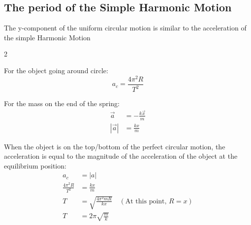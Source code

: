 \subsection{The period of the Simple Harmonic Motion}
The y-component of the uniform circular motion is similar to the acceleration of the simple Harmonic Motion
\begin{paracol}{2}
    \begin{leftcolumn}
        For the object going around circle:
        \begin{equation}
            a_c = \frac{4 \pi^2 R}{T^2}
        \end{equation}
    \end{leftcolumn}
    \begin{rightcolumn}
        For the mass on the end of the spring:
        \begin{align*}
            \vec{a} &= -\frac{k \vec{x}}{m}\\
            \left| \vec{a} \right| &= \frac{kx}{m}
        \end{align*}
    \end{rightcolumn}
\end{paracol}

When the object is on the top/bottom of the perfect circular motion, the acceleration is equal to the magnitude of the acceleration of the object at the equilibrium position:
\begin{align*}
    a_c &= \left| a \right|\\
    \frac{4 \pi^2 R}{T^2} &= \frac{kx}{m}\\
    T &= \sqrt{\frac{4\pi^2 mR}{kx}} \quad (\text{At this point, } R = x)\\
    T &= 2\pi \sqrt{\frac{m}{k}}
\end{align*}
